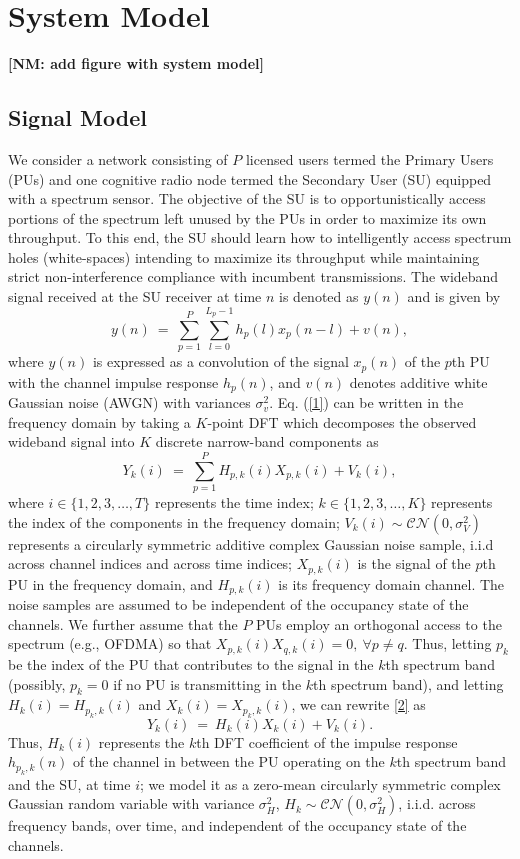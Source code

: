 \documentclass[10pt,twocolumn]{IEEEtran}
\newcommand{\nm}[1]{{\color{blue}\bf{[NM: #1]}}}
\begin{document}
\section{System Model}
\nm{add figure with system model}
\subsection{Signal Model}\label{A}
We consider a network consisting of $P$ licensed users termed the Primary Users (PUs) and one cognitive radio node termed the Secondary User (SU) equipped with a spectrum sensor. The objective of the SU is to opportunistically access portions of the spectrum left unused by the PUs in order to maximize its own throughput. To this end, the SU should learn how to intelligently access spectrum holes (white-spaces) intending to maximize its throughput while maintaining strict non-interference compliance with incumbent transmissions.
The wideband signal received at the SU receiver at time $n$ is denoted as $y(n)$ and is given by 
\begin{equation}\label{1}
    y(n)\ =\ \sum_{p=1}^{P}\sum_{l=0}^{L_{p}-1} h_{p}(l)x_{p}(n-l) + v(n),
\end{equation}
where $y(n)$ is expressed as a convolution of the signal $x_{p}(n)$ of the $p$th PU with the channel impulse response $h_{p}(n)$, and $v(n)$ denotes additive white Gaussian noise (AWGN) with variances $\sigma_v^2$. Eq. (\ref{1}) can be written in the frequency domain by taking a $K$-point DFT which decomposes the observed wideband signal into $K$ discrete narrow-band components as 
\begin{equation}\label{2}
    Y_k(i)\ =\ \sum_{p=1}^{P}H_{p,k}(i)X_{p,k}(i)+V_k(i),
\end{equation}
where $i \in \{1,2,3,\dots,T\}$ represents the time index; $k \in \{1,2,3,\dots,K\}$ represents the index of the components in the frequency domain; $V_k(i) \sim \mathcal{CN}(0,\sigma_V^2)$ represents a circularly symmetric additive complex Gaussian noise sample, i.i.d across channel indices and across time indices; $X_{p,k}(i)$ is the signal of the $p$th PU in the frequency domain, and $H_{p,k}(i)$ is its frequency domain channel. The noise samples are assumed to be independent of the occupancy state of the channels. We further assume that the $P$ PUs employ an orthogonal access to the spectrum (e.g., OFDMA) so that $X_{p,k}(i)X_{q,k}(i)=0,\ \forall p\neq q$. Thus, letting $p_k$ be the index of the PU that contributes to the signal in the $k$th spectrum band (possibly, $p_k=0$ if no PU is transmitting in the $k$th spectrum band), and letting  $H_{k}(i)=H_{p_k,k}(i)$ and $X_{k}(i)=X_{p_k,k}(i)$, we can rewrite \eqref{2} as 
\begin{equation}\label{3}
    Y_k(i)\ =\ H_{k}(i)X_{k}(i) + V_k(i).
\end{equation}
Thus, $H_k(i)$ represents the $k$th DFT coefficient of the impulse response $h_{p_k,k}(n)$ of the channel in between the PU operating on the $k$th spectrum band and the SU, at time $i$; we model it as a zero-mean circularly symmetric complex Gaussian random variable with variance $\sigma_H^2$, $H_k \sim \mathcal{CN}(0,\sigma_H^2)$, i.i.d. across frequency bands, over time, and independent of the occupancy state of the channels.
\end{document}
